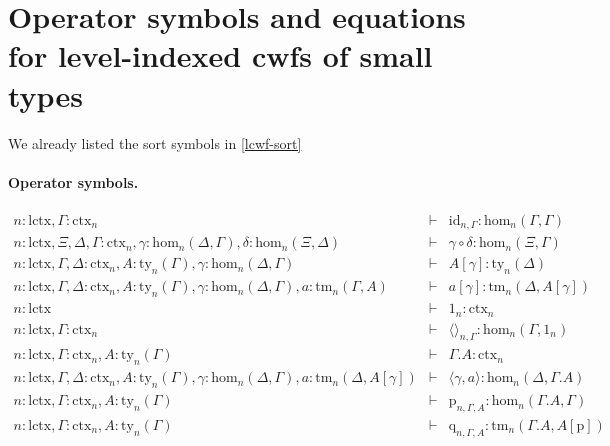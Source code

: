 \documentclass[11pt,a4paper]{article}
\theoremstyle{plain}
\theoremstyle{definition}
\newcommand{\id}{\mathsf{id}}
\def\sub{\mathrm{hom}}
\def\id{\mathrm{id}}
\def\lctx{\mathrm{lctx}}
\def\lp{\mathrm{lp}}
\newcommand{\ctx}{\mathrm{ctx}}
\newcommand{\ty}{\mathrm{ty}}
\newcommand{\tm}{\mathrm{tm}}
\newcommand{\tuple}[1]{\langle #1 \rangle}
\newcommand{\cext}{.}
\def\p{\mathrm{p}}
\def\q{\mathrm{q}}
\begin{document}



\appendix
\section{Operator symbols and equations for level-indexed cwfs of small types}

We already listed the sort symbols in \ref{lcwf-sort}

\paragraph{Operator symbols.} 
\begin{eqnarray*}
n : \lctx, \Gamma : \ctx_n &\vdash& \id_{n,\Gamma} : \sub_n(\Gamma,\Gamma)\\
n : \lctx, \Xi,\Delta,\Gamma : \ctx_n, \gamma : \sub_n(\Delta,\Gamma), \delta : \sub_n(\Xi,\Delta) &\vdash&
\gamma \circ \delta : \sub_n(\Xi,\Gamma)\\
n : \lctx, \Gamma,\Delta : \ctx_n, A:\ty_n(\Gamma), \gamma : \sub_n(\Delta,\Gamma) &\vdash&
A[\gamma] : \ty_n(\Delta)\\
n : \lctx, \Gamma,\Delta : \ctx_n, A:\ty_n(\Gamma), \gamma : \sub_n(\Delta,\Gamma), a:\tm_n(\Gamma,A) &\vdash&  a[\gamma] : \tm_n(\Delta,A[\gamma])\\
n : \lctx &\vdash& 1_n : \ctx_n\\
n : \lctx, \Gamma : \ctx_n &\vdash& \tuple{}_{n,\Gamma} : \sub_n(\Gamma,1_n)\\
n : \lctx, \Gamma : \ctx_n, A:\ty_n (\Gamma) &\vdash& \Gamma \cext A : \ctx_n \\
n : \lctx, \Gamma,\Delta : \ctx_n , A:\ty_n (\Gamma), \gamma : \sub_n (\Delta,\Gamma), a:\tm_n (\Delta,A[\gamma]) &\vdash& \tuple{\gamma,a} : \sub_n (\Delta,\Gamma\cext A)\\
n : \lctx, \Gamma : \ctx_n , A:\ty_n (\Gamma) &\vdash& \p_{n,\Gamma,A}: \sub_n (\Gamma\cext A,\Gamma)\\
n : \lctx, \Gamma : \ctx_n , A:\ty_n (\Gamma) &\vdash& \q_{n,\Gamma,A}: \tm_n (\Gamma\cext A,A[\p])
\end{eqnarray*}
\end{document}
